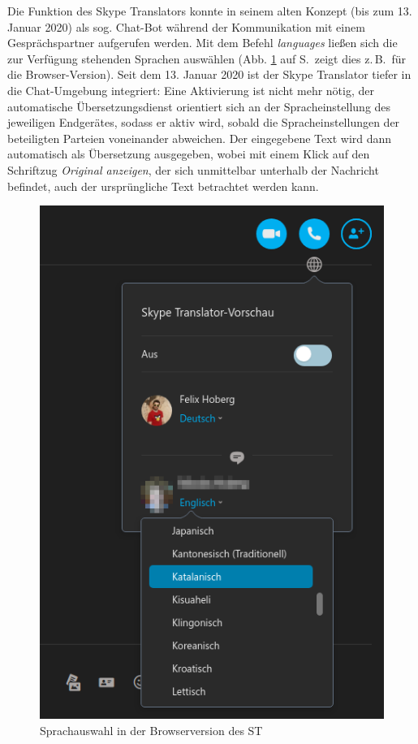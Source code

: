 Die Funktion des Skype Translators konnte in seinem alten Konzept (bis zum 13. Januar 2020) als sog. Chat-Bot während der Kommunikation mit einem Gesprächspartner aufgerufen werden. Mit dem Befehl \emph{\@Skypetranslator languages} ließen sich die zur Verfügung stehenden Sprachen auswählen (Abb. \ref{K3:fig:Browser-Sprachauswahl-ST} auf S.\,\pageref{K3:fig:Browser-Sprachauswahl-ST} zeigt dies z.\,B.\ für die Browser-Version). Seit dem 13. Januar 2020 ist der Skype Translator tiefer in die Chat-Umgebung integriert: Eine Aktivierung ist nicht mehr nötig, der automatische Übersetzungsdienst orientiert sich an der Spracheinstellung des jeweiligen Endgerätes, sodass er aktiv wird, sobald die Spracheinstellungen der beteiligten Parteien voneinander abweichen. Der eingegebene Text wird dann automatisch als Übersetzung ausgegeben, wobei mit einem Klick auf den Schriftzug \emph{Original anzeigen}, der sich unmittelbar unterhalb der Nachricht befindet, auch der ursprüngliche Text betrachtet werden kann.


\begin{figure}
    \includegraphics[width=.7\textwidth]{Figures/Skype/browser_skype_translator-ausschnitt.png}
	\caption{Sprachauswahl in der Browserversion des ST\label{K3:fig:Browser-Sprachauswahl-ST}}
\end{figure}

